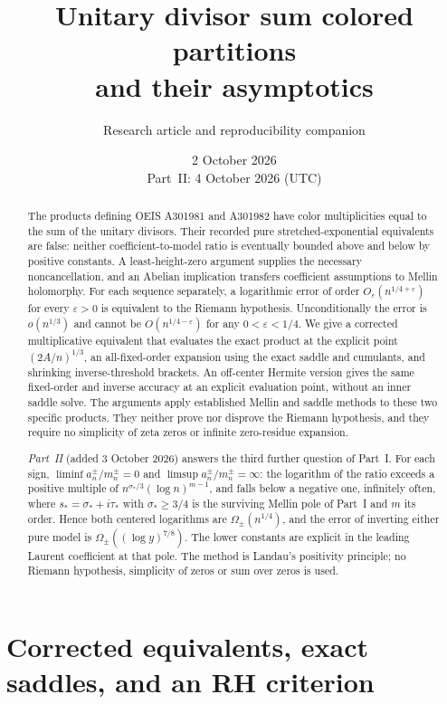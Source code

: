 \documentclass[11pt]{article}
\title{Unitary divisor sum colored partitions\\and their asymptotics}
\author{Research article and reproducibility companion}
\date{2 October 2026\\[2pt]\small Part~II: 4 October 2026 (UTC)}
\theoremstyle{remark}\newtheorem{remark}[theorem]{Remark}
\newcommand{\eps}{\varepsilon}
\numberwithin{equation}{section}
\begin{document}
\maketitle
\begin{abstract}
The products defining OEIS A301981 and A301982 have color multiplicities equal to the sum of the unitary divisors. Their recorded pure stretched-exponential equivalents are false: neither coefficient-to-model ratio is eventually bounded above and below by positive constants. A least-height-zero argument supplies the necessary noncancellation, and an Abelian implication transfers coefficient assumptions to Mellin holomorphy. For each sequence separately, a logarithmic error of order $O_\eps(n^{1/4+\eps})$ for every $\eps>0$ is equivalent to the Riemann hypothesis. Unconditionally the error is $o(n^{1/3})$ and cannot be $O(n^{1/4-\eps})$ for any $0<\eps<1/4$. We give a corrected multiplicative equivalent that evaluates the exact product at the explicit point $(2A/n)^{1/3}$, an all-fixed-order expansion using the exact saddle and cumulants, and shrinking inverse-threshold brackets. An off-center Hermite version gives the same fixed-order and inverse accuracy at an explicit evaluation point, without an inner saddle solve. The arguments apply established Mellin and saddle methods to these two specific products. They neither prove nor disprove the Riemann hypothesis, and they require no simplicity of zeta zeros or infinite zero-residue expansion.

\emph{Part~II} (added 3 October 2026) answers the third further question of Part~I. For each sign, $\liminf a_n^\pm/m_n^\pm=0$ and $\limsup a_n^\pm/m_n^\pm=\infty$: the logarithm of the ratio exceeds a positive multiple of $n^{\sigma_*/3}(\log n)^{m-1}$, and falls below a negative one, infinitely often, where $s_*=\sigma_*+i\tau_*$ with $\sigma_*\ge3/4$ is the surviving Mellin pole of Part~I and $m$ its order. Hence both centered logarithms are $\Omega_\pm(n^{1/4})$, and the error of inverting either pure model is $\Omega_\pm((\log y)^{7/8})$. The lower constants are explicit in the leading Laurent coefficient at that pole. The method is Landau's positivity principle; no Riemann hypothesis, simplicity of zeros or sum over zeros is used.
\end{abstract}
\tableofcontents

\part{Corrected equivalents, exact saddles, and an RH criterion}\label{udp:part:one}
\end{document}

